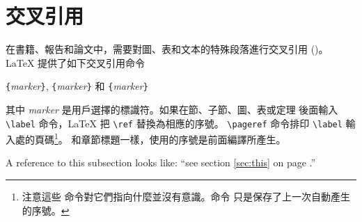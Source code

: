 \section{交叉引用}

在書籍、報告和論文中，需要對圖、表和文本的特殊段落進行交叉引用 ()。
\LaTeX{} 提供了如下交叉引用命令
\begin{lscommand}
\verb|{|\emph{marker}\verb|}|,
\verb|{|\emph{marker}\verb|}| 和 \verb|{|\emph{marker}\verb|}|
\end{lscommand}
\noindent
其中 \emph{marker} 是用戶選擇的標識符。如果在節、子節、圖、表或定理
後面輸入 \verb|\label| 命令，\LaTeX{} 把 \verb|\ref| 替換為相應的序號。
\verb|\pageref| 命令排印 \verb|\label| 輸入處的頁碼\footnote{注意這些
命令對它們指向什麼並沒有意識。命令  只是保存了上一次自動產生的序號。}。
和章節標題一樣，使用的序號是前面編譯所產生。

%
\begin{example}
A reference to this subsection
\label{sec:this} looks like:
``see section \ref{sec:this} on
page \pageref{sec:this}.''
\end{example}

